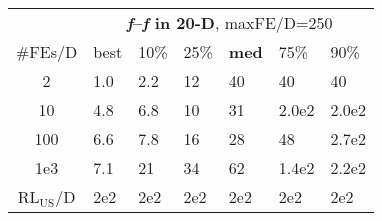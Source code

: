 \begin{tabular}{c|llllll}
 & \multicolumn{6}{|c}{\textbf{\textit{f}\raisebox{-0.35ex}{1}--\textit{f}\raisebox{-0.35ex}{24} in 20-D}, maxFE/D=250}\\
\#FEs/D & best & 10\% & 25\% & \textbf{med} & 75\% & 90\%\\
2 & \hspace*{1ex}1.0 & \hspace*{1ex}2.2 & 12 & 40 & 40 & 40\\
10 & \hspace*{1ex}4.8 & \hspace*{1ex}6.8 & 10 & 31 & 2.0e2 & 2.0e2\\
100 & \hspace*{1ex}6.6 & \hspace*{1ex}7.8 & 16 & 28 & 48 & 2.7e2\\
1e3 & \hspace*{1ex}7.1 & 21 & 34 & 62 & 1.4e2 & 2.2e2\\
$\text{RL}_{\text{US}}$/D & 2e2 & 2e2 & 2e2 & 2e2 & 2e2 & 2e2
\end{tabular}
